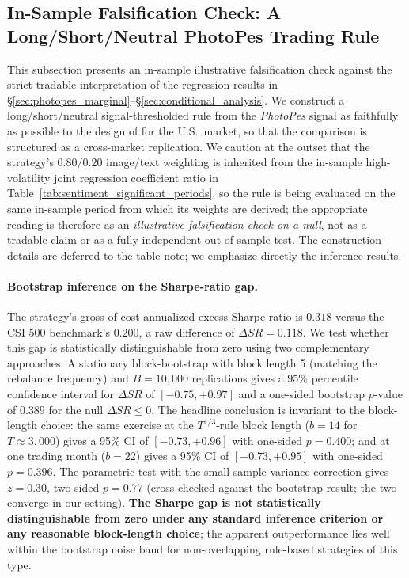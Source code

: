 \documentclass[AER]{AEA}
\begin{document}
\subsection{In-Sample Falsification Check: A Long/Short/Neutral PhotoPes Trading Rule}
This subsection presents an in-sample illustrative falsification check against the strict-tradable interpretation of the regression results in \S\ref{sec:photopes_marginal}--\S\ref{sec:conditional_analysis}. We construct a long/short/neutral signal-thresholded rule from the \textit{PhotoPes} signal as faithfully as possible to the design of \citet{obaid2022picture} for the U.S.\ market, so that the comparison is structured as a cross-market replication. We caution at the outset that the strategy's $0.80/0.20$ image/text weighting is inherited from the in-sample high-volatility joint regression coefficient ratio in Table~\ref{tab:sentiment_significant_periods}, so the rule is being evaluated on the same in-sample period from which its weights are derived; the appropriate reading is therefore as an \emph{illustrative falsification check on a null}, not as a tradable claim or as a fully independent out-of-sample test. The construction details are deferred to the table note; we emphasize directly the inference results.

\paragraph{Bootstrap inference on the Sharpe-ratio gap.} The strategy's gross-of-cost annualized excess Sharpe ratio is $0.318$ versus the CSI 500 benchmark's $0.200$, a raw difference of $\Delta SR = 0.118$. We test whether this gap is statistically distinguishable from zero using two complementary approaches. A stationary block-bootstrap \citep{politis1994stationary} with block length 5 (matching the rebalance frequency) and $B=10{,}000$ replications gives a 95\% percentile confidence interval for $\Delta SR$ of $[-0.75, +0.97]$ and a one-sided bootstrap $p$-value of $0.389$ for the null $\Delta SR \le 0$. The headline conclusion is invariant to the block-length choice: the same exercise at the \citet{politis1994stationary} $T^{1/3}$-rule block length ($b=14$ for $T \approx 3{,}000$) gives a 95\% CI of $[-0.73, +0.96]$ with one-sided $p=0.400$; and at one trading month ($b=22$) gives a 95\% CI of $[-0.73, +0.95]$ with one-sided $p=0.396$. The parametric \citet{jobson1981performance} test with the \citet{memmel2003performance} small-sample variance correction gives $z = 0.30$, two-sided $p = 0.77$ (cross-checked against the bootstrap result; the two converge in our setting). \textbf{The Sharpe gap is not statistically distinguishable from zero under any standard inference criterion or any reasonable block-length choice}; the apparent outperformance lies well within the bootstrap noise band for non-overlapping rule-based strategies of this type.
\end{document}

